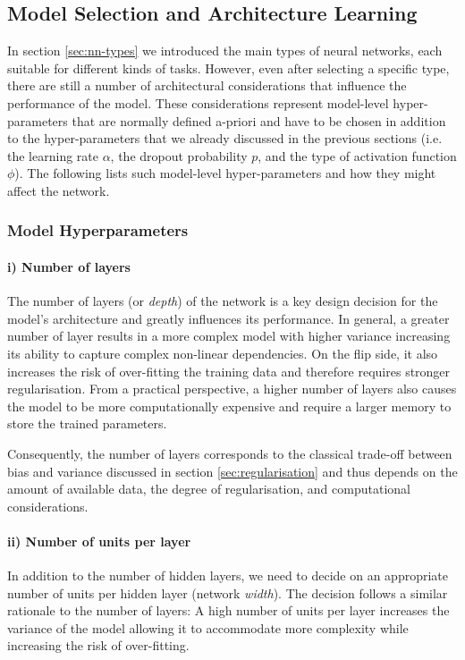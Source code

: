 \subsection{Model Selection and Architecture Learning} 
In section \ref{sec:nn-types} we introduced the main types of neural networks, each suitable for different kinds of tasks. However, even after selecting a specific type, there are still a number of architectural considerations that influence the performance of the model. These considerations represent model-level hyper-parameters that are normally defined a-priori and have to be chosen in addition to the hyper-parameters that we already discussed in the previous sections (i.e. the learning rate $\alpha$, the dropout probability $p$, and the type of activation function $\phi$). The following lists such model-level hyper-parameters and how they might affect the network. 

\subsubsection{Model Hyperparameters}
\paragraph{i) Number of layers} The number of layers (or \emph{depth}) of the network is a key design decision for the model's architecture and greatly influences its performance. In general, a greater number of layer results in a more complex model with higher variance increasing its ability to capture complex non-linear dependencies. On the flip side, %
it also increases the risk of  over-fitting the training data and therefore requires stronger regularisation. From a practical perspective, a higher number of layers also causes the model to be more computationally expensive and require a larger memory to store the trained parameters. 

Consequently, the number of layers corresponds to the classical trade-off between bias and variance discussed in section \ref{sec:regularisation} and thus depends on the amount of available data, the degree of regularisation, and computational considerations. 


\paragraph{ii) Number of units per layer} In addition to the number of hidden layers, we need to decide on an appropriate number of units per hidden layer (network \emph{width}). The decision follows a similar rationale to the number of layers: A high number of units per layer increases the variance of the model allowing it to accommodate more complexity while increasing the risk of over-fitting.  



